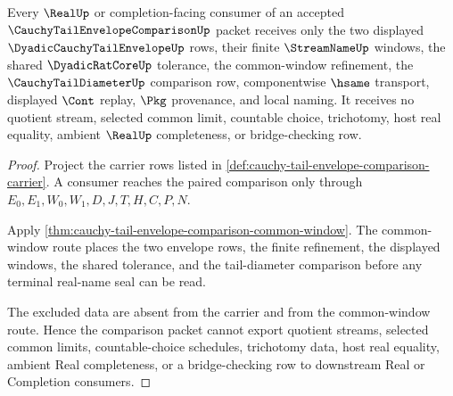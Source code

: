 \begin{theorem}
\label{thm:cauchy-tail-envelope-comparison-nonescape}
Every $\RealUp$ or completion-facing consumer of an accepted $\CauchyTailEnvelopeComparisonUp$ packet receives only the two displayed $\DyadicCauchyTailEnvelopeUp$ rows, their finite $\StreamNameUp$ windows, the shared $\DyadicRatCoreUp$ tolerance, the common-window refinement, the $\CauchyTailDiameterUp$ comparison row, componentwise $\hsame$ transport, displayed $\Cont$ replay, $\Pkg$ provenance, and local naming. It receives no quotient stream, selected common limit, countable choice, trichotomy, host real equality, ambient $\RealUp$ completeness, or bridge-checking row.
\end{theorem}
\begin{proof}
Project the carrier rows listed in \autoref{def:cauchy-tail-envelope-comparison-carrier}. A consumer reaches the paired comparison only through $E_0,E_1,W_0,W_1,D,J,T,H,C,P,N$.

Apply \autoref{thm:cauchy-tail-envelope-comparison-common-window}. The common-window route places the two envelope rows, the finite refinement, the displayed windows, the shared tolerance, and the tail-diameter comparison before any terminal real-name seal can be read.

The excluded data are absent from the carrier and from the common-window route. Hence the comparison packet cannot export quotient streams, selected common limits, countable-choice schedules, trichotomy data, host real equality, ambient Real completeness, or a bridge-checking row to downstream Real or Completion consumers.
\end{proof}


